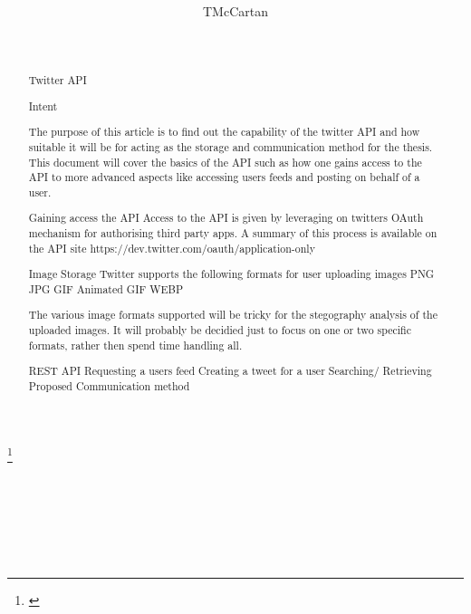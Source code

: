\documentclass[12pt]{article}
\theoremstyle{definition}
\theoremstyle{remark}
\numberwithin{equation}{section}
\begin{document}
\title[Forensic Twitter API Anaylsis]{}%
\author{TMcCartan}%
\address{}%
\thanks{}%
\date{}%
\begin{abstract}
  Twitter API
  
  Intent
  
  The purpose of this article is to find out the capability of the twitter API and how suitable it will be for acting as the storage and communication method for the thesis. This document will cover the basics of the API such as how one gains access to the API to more advanced aspects like accessing users feeds and posting on behalf of a user.  
  
  Gaining access the API
  Access to the API is given by leveraging on twitters OAuth mechanism for authorising third party apps. A summary of this process is available on the API site 
  https://dev.twitter.com/oauth/application-only
  
  Image Storage
  Twitter supports the following formats for user uploading images
  PNG
  JPG
  GIF
  Animated GIF
  WEBP
  
    The various image formats supported will be tricky for the stegography analysis of the uploaded images. It will    probably be decidied just to focus on one or two specific formats, rather then spend time handling all. 
  
  REST API
    Requesting a users feed
    Creating a tweet for a user
    Searching/ Retrieving
  Proposed Communication method
  
  
\end{abstract}
\maketitle
\section{}


\end{document}
